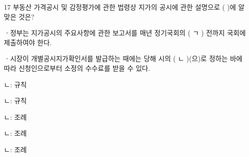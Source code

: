 \begin{question}{17}
부동산 가격공시 및 감정평가에 관한 법령상 지가의 공시에 관한 설명으로 ( )에 알맞은 것은?
\begin{framedtext}
ㆍ정부는 지가공시의 주요사항에 관한 보고서를 매년 정기국회의 ( ㄱ ) 전까지 국회에 제출하여야 한다. \par
ㆍ시장이 개별공시지가확인서를 발급하는 때에는 당해 시의 ( ㄴ )(으)로 정하는 바에 따라 신청인으로부터 소정의 수수료를 받을 수 있다. \par
\end{framedtext}
\begin{choices}
  \item {}ㄴ: 규칙
  \item {}ㄴ: 규칙
  \item {}ㄴ: 조례
  \item {}ㄴ: 조례
  \item {}ㄴ: 조례
\end{choices}
\end{question}
